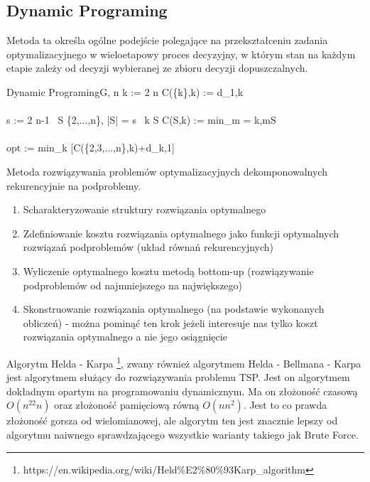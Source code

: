 \documentclass[a4paper,12pt]{article}
\begin{document}
\subsection{Dynamic Programing}
Metoda ta określa ogólne podejście polegające na przekształceniu zadania 
optymalizacyjnego w wieloetapowy proces decyzyjny, w którym stan na każdym
etapie zależy od decyzji wybieranej ze zbioru decyzji dopuszczalnych.

\begin{center}
    \begin{pseudocode}[ruled]{Dynamic Programing}{G, n}
        \FOR k :=  2 \TO n \DO
        \BEGIN
        C(\{k\},k) := d_{1,k}\\
        \END\\
        \FOR s := 2 \TO n-1 \DO
        \BEGIN
        \FOR \forall \ S \in \{2,...,n\}, |S| = s \DO
        \BEGIN
        \FOR \forall \ k \in S \DO
        C(S,k) := min_{m \not= k,m\in S}
        \END
        \END
        \\\\opt := min_{k} [C(\{2,3,...,n\},k)+d_{k,1}]\\
    \end{pseudocode} 
\end{center}

Metoda rozwiązywania problemów optymalizacyjnych dekomponowalnych rekurencyjnie 
na podproblemy.
\begin{enumerate}
    \item Scharakteryzowanie struktury rozwiązania optymalnego
    \item Zdefiniowanie kosztu rozwiązania optymalnego jako funkcji optymalnych 
    rozwiązań podproblemów (układ równań rekurencyjnych)
    \item Wyliczenie optymalnego kosztu metodą bottom-up 
    (rozwiązywanie podproblemów od najmniejszego na największego)
    \item Skonstruowanie rozwiązania optymalnego (na podstawie wykonanych obliczeń)
    - można pominąć ten krok jeżeli interesuje nas tylko koszt rozwiązania
    optymalnego a nie jego osiągnięcie
\end{enumerate}

Algorytm Helda - Karpa \footnote{https://en.wikipedia.org/wiki/Held\%E2\%80\%93Karp\_algorithm}, zwany również algorytmem Helda - Bellmana - Karpa
jest algorytmem służący do rozwiązywania problemu TSP. Jest on algorytmem dokładnym
opartym na programowaniu dynamicznym. Ma on złożoność czasową $O(n^22n)$ oraz 
złożoność pamięciową równą $O(nn^2)$. Jest to co prawda złożoność gorsza od wielomianowej, 
ale algorytm ten jest znacznie lepszy od algorytmu naiwnego sprawdzającego wszystkie warianty
takiego jak Brute Force.
\end{document}
